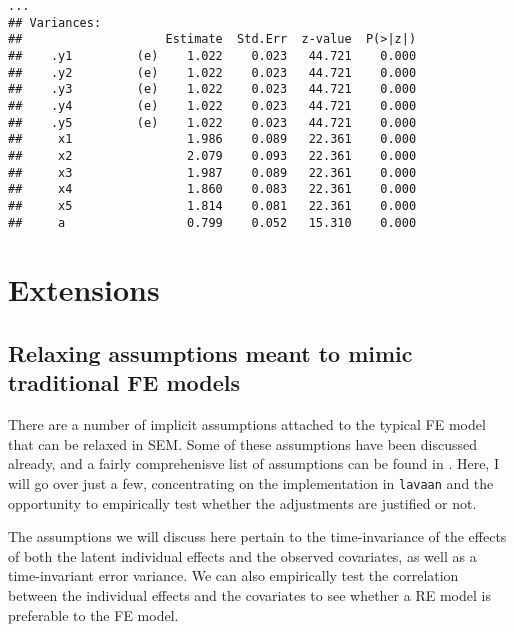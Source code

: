\documentclass[]{interact}
\theoremstyle{plain}%
\theoremstyle{definition}
\theoremstyle{remark}
\begin{document}
\singlespacing

\begin{verbatim}
...
## Variances:
##                    Estimate  Std.Err  z-value  P(>|z|)
##    .y1         (e)    1.022    0.023   44.721    0.000
##    .y2         (e)    1.022    0.023   44.721    0.000
##    .y3         (e)    1.022    0.023   44.721    0.000
##    .y4         (e)    1.022    0.023   44.721    0.000
##    .y5         (e)    1.022    0.023   44.721    0.000
##     x1                1.986    0.089   22.361    0.000
##     x2                2.079    0.093   22.361    0.000
##     x3                1.987    0.089   22.361    0.000
##     x4                1.860    0.083   22.361    0.000
##     x5                1.814    0.081   22.361    0.000
##     a                 0.799    0.052   15.310    0.000
\end{verbatim}

\doublespacing

\hypertarget{extensions}{%
\section{Extensions}\label{extensions}}

\hypertarget{relax}{%
\subsection{Relaxing assumptions meant to mimic traditional FE
models}\label{relax}}

There are a number of implicit assumptions attached to the typical FE
model that can be relaxed in SEM. Some of these assumptions have been
discussed already, and a fairly comprehenisve list of assumptions can be
found in \citet{Bollen2010}. Here, I will go over just a few,
concentrating on the implementation in \texttt{lavaan} and the
opportunity to empirically test whether the adjustments are justified or
not.

The assumptions we will discuss here pertain to the time-invariance of
the effects of both the latent individual effects and the observed
covariates, as well as a time-invariant error variance. We can also
empirically test the correlation between the individual effects and the
covariates to see whether a RE model is preferable to the FE model.
\end{document}

